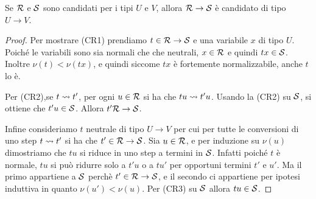 \documentclass[]{marticle}
\begin{document}
\begin{block} [Lemma]
    Se $\mathcal{R}$ e $\mathcal{S}$ sono candidati per i tipi $U$ e $V$, allora
    $\mathcal{R}\rightarrow\mathcal{S}$ \`e candidato di tipo $U\rightarrow V$.
\end{block}
\begin{proof}
    Per mostrare (CR1) prendiamo $t\in\mathcal{R}\rightarrow\mathcal{S}$ e una variabile
    $x$ di tipo $U$. Poich\'e le variabili sono sia normali che che neutrali,
    $x\in \mathcal{R}$ e quindi $tx\in\mathcal{S}$. Inoltre $\nu(t)<\nu(tx)$, e quindi
    siccome $tx$ \`e fortemente normalizzabile, anche $t$ lo \`e.

    Per (CR2),se $t\rightsquigarrow t'$, per ogni $u \in \mathcal{R}$ si ha che $tu\rightsquigarrow
    t'u$. Usando la (CR2) su $\mathcal{S}$, si ottiene che $t'u\in\mathcal{S}$. Allora
    $t'\mathcal{R}\rightarrow\mathcal{S}$.

    Infine consideriamo $t$ neutrale di tipo $U\rightarrow V$ per cui per tutte
    le conversioni di uno step $t\rightsquigarrow t'$ si ha che $t' \in
    \mathcal{R}\rightarrow\mathcal{S}$. Sia $u\in\mathcal{R}$, e per induzione su $\nu(u)$
    dimostriamo che $tu$ si riduce in uno step a termini in $\mathcal{S}$. Infatti
    poich\'e $t$ \`e normale, $tu$ si pu\`o ridurre solo a $t'u$ o a $tu'$ per
    opportuni termini $t'$ e $u'$. Ma il primo appartiene a $\mathcal{S}$ perch\`e
    $t'\in\mathcal{R}\rightarrow\mathcal{S}$, e il secondo ci appartiene per ipotesi
    induttiva in quanto $\nu(u')<\nu(u)$. Per (CR3) su $\mathcal{S}$ allora
    $tu\in\mathcal{S}$. 
\end{proof}
\end{document}
